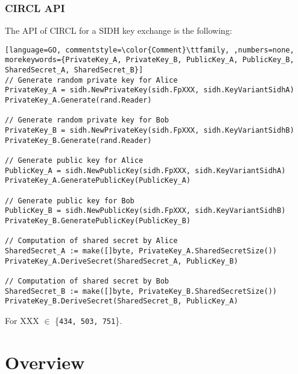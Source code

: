 \subsubsection{CIRCL API}
The API of CIRCL for a SIDH key exchange is the following:

\begin{lstlisting}[language=GO, commentstyle=\color{Comment}\ttfamily, ,numbers=none, morekeywords={PrivateKey_A, PrivateKey_B, PublicKey_A, PublicKey_B, SharedSecret_A, SharedSecret_B}]
// Generate random private key for Alice
PrivateKey_A = sidh.NewPrivateKey(sidh.FpXXX, sidh.KeyVariantSidhA)
PrivateKey_A.Generate(rand.Reader)

// Generate random private key for Bob
PrivateKey_B = sidh.NewPrivateKey(sidh.FpXXX, sidh.KeyVariantSidhB)
PrivateKey_B.Generate(rand.Reader)

// Generate public key for Alice
PublicKey_A = sidh.NewPublicKey(sidh.FpXXX, sidh.KeyVariantSidhA)
PrivateKey_A.GeneratePublicKey(PublicKey_A)

// Generate public key for Bob
PublicKey_B = sidh.NewPublicKey(sidh.FpXXX, sidh.KeyVariantSidhB)
PrivateKey_B.GeneratePublicKey(PublicKey_B)

// Computation of shared secret by Alice
SharedSecret_A := make([]byte, PrivateKey_A.SharedSecretSize())
PrivateKey_A.DeriveSecret(SharedSecret_A, PublicKey_B)

// Computation of shared secret by Bob
SharedSecret_B := make([]byte, PrivateKey_B.SharedSecretSize())
PrivateKey_B.DeriveSecret(SharedSecret_B, PublicKey_A)

\end{lstlisting}
For XXX $\in$ \{\texttt{434, 503, 751}\}.

\section{Overview}

